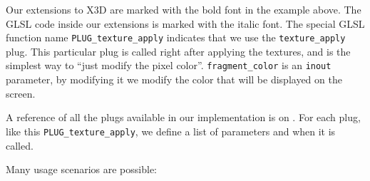 \documentclass{egpubl}
\begin{document}
Our extensions to X3D are marked with the bold font in the example above.
The GLSL code inside our extensions is marked with the italic font.
The special GLSL function name \texttt{PLUG\_texture\_apply}
indicates that we use the \texttt{texture\_apply} plug.
This particular plug is called right after applying the textures,
and is the simplest way to ``just modify the pixel color''.
\texttt{fragment\_color} is an \texttt{inout} parameter, by modifying it
we modify the color that will be displayed on the screen.

A reference of all the plugs available in our implementation
is on .
For each plug, like this \texttt{PLUG\_texture\_apply},
we define a list of parameters
and when it is called.

\needspace{1in}
Many usage scenarios are possible:
\end{document}
